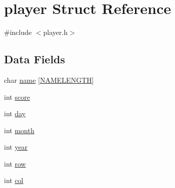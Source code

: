 \hypertarget{structplayer}{\section{player Struct Reference}
\label{structplayer}
}


{\ttfamily \#include $<$player.\-h$>$}

\subsection*{Data Fields}
\begin{DoxyCompactItemize}
\item 
char \hyperlink{structplayer_ade40c7dcb824cf7ccf1d12f56df289e7}{name} \mbox{[}\hyperlink{player_8h_a705aaddab1ccc73f063282e9bacd3ff8}{N\-A\-M\-E\-L\-E\-N\-G\-T\-H}\mbox{]}
\item 
int \hyperlink{structplayer_aef160b7437d94056f1dc59646cd5b87d}{score}
\item 
int \hyperlink{structplayer_a4c11afc03fc3ee49bab660def6558f2a}{day}
\item 
int \hyperlink{structplayer_aedb06abe5aff12fa3e7e0e71a374edfb}{month}
\item 
int \hyperlink{structplayer_abeac221e38b7b9ce7df8722c842bf671}{year}
\item 
int \hyperlink{structplayer_af1d3cff2e4538e23400e260bae3dadad}{row}
\item 
int \hyperlink{structplayer_afb52e720f5f0c483db5861f9e42e924e}{col}
\end{DoxyCompactItemize}


